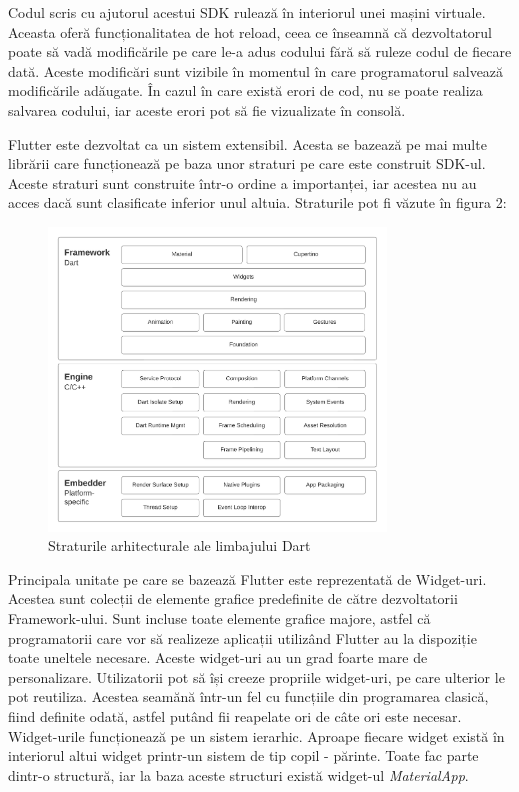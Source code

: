 \documentclass[12pt,a4paper]{report}
\theoremstyle{definition}
\theoremstyle{remark}
\begin{document}
Codul scris cu ajutorul acestui SDK rulează în interiorul unei mașini virtuale. Aceasta oferă funcționalitatea de hot reload, ceea ce înseamnă că dezvoltatorul poate să vadă modificările pe care le-a adus codului fără să ruleze codul de fiecare dată. Aceste modificări sunt vizibile în momentul în care programatorul salvează modificările adăugate. În cazul în care există erori de cod, nu se poate realiza salvarea codului, iar aceste erori pot să fie vizualizate în consolă. 

Flutter este dezvoltat ca un sistem extensibil. Acesta se bazează pe mai multe librării care funcționează pe baza unor straturi pe care este construit SDK-ul. Aceste straturi sunt construite într-o ordine a importanței, iar acestea nu au acces dacă sunt clasificate inferior unul altuia. Straturile pot fi văzute în figura 2:
\begin{figure}[H]
    	\centering
    	\includegraphics[width = 0.8\textwidth]{images/archdiagram}
	\caption{Straturile arhitecturale ale limbajului Dart}
\end{figure}
\vspace{15pt}
Principala unitate pe care se bazează Flutter este reprezentată de Widget-uri. Acestea sunt colecții de elemente grafice predefinite de către dezvoltatorii Framework-ului. Sunt incluse toate elemente grafice majore, astfel că programatorii care vor să realizeze aplicații utilizând Flutter au la dispoziție toate uneltele necesare. Aceste widget-uri au un grad foarte mare de personalizare. Utilizatorii pot să își creeze propriile widget-uri, pe care ulterior le pot reutiliza. Acestea seamănă într-un fel cu funcțiile din programarea clasică, fiind definite odată, astfel putând fii reapelate ori de câte ori este necesar. Widget-urile funcționează pe un sistem ierarhic. Aproape fiecare widget există în interiorul altui widget printr-un sistem de tip copil - părinte. Toate fac parte dintr-o structură, iar la baza aceste structuri există widget-ul \emph{MaterialApp}. 
\end{document}
